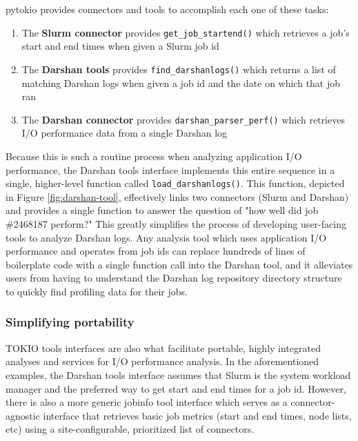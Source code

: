 pytokio provides connectors and tools to accomplish each one of these tasks:

\begin{enumerate}[leftmargin=*]
\item The \textbf{Slurm connector} provides \texttt{get\_job\_startend()} which retrieves a job's start and end times when given a Slurm job id
\item The \textbf{Darshan tools} provides \texttt{find\_darshanlogs()} which returns a list of matching Darshan logs when given a job id and the date on which that job ran
\item The \textbf{Darshan connector} provides \texttt{darshan\_parser\_perf()} which retrieves I/O performance data from a single Darshan log
\end{enumerate}

Because this is such a routine process when analyzing application I/O performance, the Darshan tools interface implements this entire sequence in a single, higher-level function called \texttt{load\_darshanlogs()}.
This function, depicted in Figure \ref{fig:darshan-tool}, effectively links two connectors (Slurm and Darshan) and provides a single function to answer the question of "how well did job \#2468187 perform?"
This greatly simplifies the process of developing user-facing tools to analyze Darshan logs.
Any analysis tool which uses application I/O performance and operates from job ids can replace hundreds of lines of boilerplate code with a single function call into the Darshan tool, and it alleviates users from having to understand the Darshan log repository directory structure to quickly find profiling data for their jobs.

\subsubsection{Simplifying portability}

TOKIO tools interfaces are also what facilitate portable, highly integrated analyses and services for I/O performance analysis.
In the aforementioned examples, the Darshan tools interface assumes that Slurm is the system workload manager and the preferred way to get start and end times for a job id.
However, there is also a more generic jobinfo tool interface which serves as a connector-agnostic interface that retrieves basic job metrics (start and end times, node lists, etc) using a site-configurable, prioritized list of connectors.

